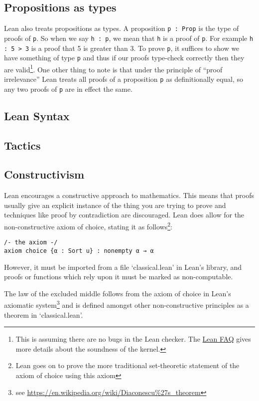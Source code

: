 \documentclass{article}
\newcommand{\ct}{\texttt}
\begin{document}
\subsection{Propositions as types}
Lean also treats propositions as types. 
A proposition \ct{p : Prop} is the type of proofs of \ct{p}.
So when we say \ct{h : p}, we mean that \ct{h} is a proof of \ct{p}.
For example \ct{h : 5 > 3} is a proof that 5 is greater than 3.
To prove \ct{p}, it suffices to show we have something of type \ct{p} and thus if our proofs type-check correctly then they are valid\footnote{This is assuming there are no bugs in the Lean checker. The \href{https://github.com/leodemoura/lean/blob/master/doc/faq.md}{Lean FAQ} gives more details about the soundness of the kernel.}.
One other thing to note is that under the principle of ``proof irrelevance'' Lean treats all proofs of a proposition \ct{p} as definitionally equal, so any two proofs of \ct{p} are in effect the same.

\subsection{Lean Syntax} 

\subsection{Tactics}

\subsection{Constructivism}
Lean encourages a constructive approach to mathematics. 
This means that proofs usually give an explicit instance of the thing you are trying to prove and techniques like proof by contradiction are discouraged.
Lean does allow for the non-constructive axiom of choice, stating it as follows\footnote{Lean goes on to prove the more traditional set-theoretic statement of the axiom of choice using this axiom}: 
\begin{lstlisting}
/- the axiom -/
axiom choice {α : Sort u} : nonempty α → α
\end{lstlisting}
However, it must be imported from a file `classical.lean' in Lean's library, and proofs or functions which rely upon it must be marked as non-computable.

The law of the excluded middle follows from the axiom of choice in Lean's axiomatic system\footnote{see \url{https://en.wikipedia.org/wiki/Diaconescu\%27s\_theorem}} and is defined amongst other non-constructive principles as a theorem in `classical.lean'. 
\end{document}
